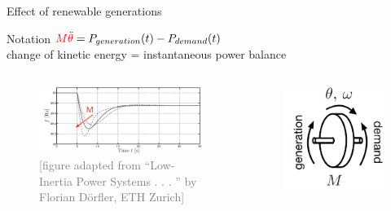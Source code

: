 \documentclass{beamer}
\begin{document}
\begin{frame}{Effect of renewable generations}
\begin{block}{Notation}
{\centering $\textcolor{red}{M \ddot{\theta}}=P_{generation}(t)-P_{demand}(t) $\\
change of kinetic energy = instantaneous power balance}
\end{block}

 


 \begin{columns}
    \begin{figure}
        \includegraphics[scale=0.2]{Figures/SystemInertia5.PNG}
        \caption{\textcolor{gray}{\tiny [figure adapted from “Low-Inertia Power Systems . . . ” by Florian Dörfler, ETH Zurich]}}
        \end{figure}
        \begin{figure}
        \includegraphics[scale=0.2]{Figures/SystemInertia6.PNG}

\end{figure}
\end{columns}
\end{frame}
\end{document}
